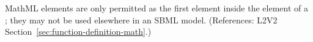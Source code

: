 MathML  elements are only permitted as the first element
inside the  element of a \FunctionDefinition; they may not be
used elsewhere in an SBML model.  (References: L2V2
Section~\ref{sec:function-definition-math}.)

